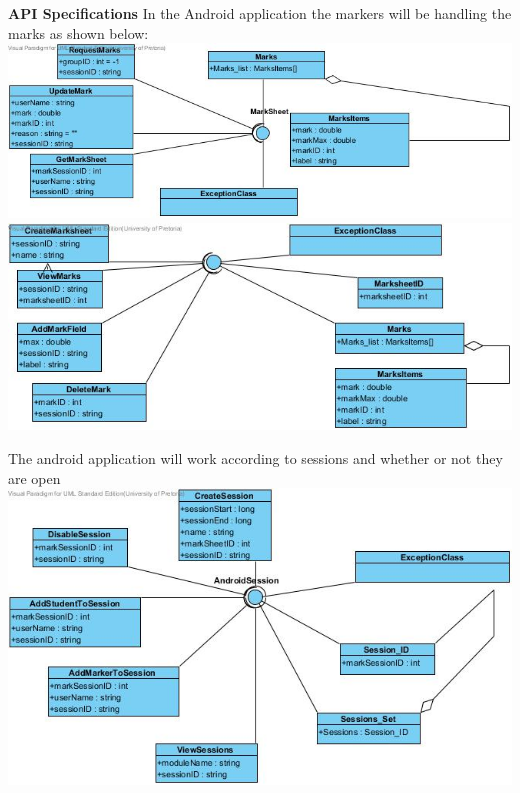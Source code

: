 \documentclass{article}
\begin{document}
\noindent \textbf{API Specifications}
In the Android application the markers will be handling the marks as shown below:
\noindent \textbf{\includegraphics[scale=0.4]{APIMarks.jpg}}
\noindent \textbf{\includegraphics[scale=0.4]{APIMarksheet.jpg}}

The android application will work according to sessions and whether or not they are open
\noindent \textbf{\includegraphics[scale=0.4]{APISession.jpg}}
\end{document}
